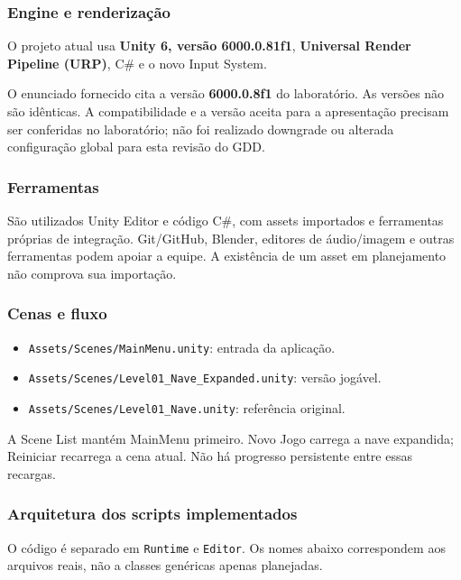 \documentclass[12pt,a4paper]{article}
\begin{document}
\subsubsection*{Engine e renderização}

O projeto atual usa \textbf{Unity 6, versão 6000.0.81f1},
\textbf{Universal Render Pipeline (URP)}, C\# e o novo Input System.

O enunciado fornecido cita a versão \textbf{6000.0.8f1} do laboratório.
As versões não são idênticas. A compatibilidade e a versão aceita
para a apresentação precisam ser conferidas no laboratório; não
foi realizado downgrade ou alterada configuração global para esta
revisão do GDD.

\subsubsection*{Ferramentas}

São utilizados Unity Editor e código C\#, com assets importados e
ferramentas próprias de integração. Git/GitHub, Blender, editores
de áudio/imagem e outras ferramentas podem apoiar a equipe.
A existência de um asset em planejamento não comprova sua importação.

\subsubsection*{Cenas e fluxo}

\begin{itemize}
\item \texttt{Assets/Scenes/MainMenu.unity}: entrada da aplicação.
\item \texttt{Assets/Scenes/Level01\_Nave\_Expanded.unity}: versão jogável.
\item \texttt{Assets/Scenes/Level01\_Nave.unity}: referência original.
\end{itemize}

A Scene List mantém MainMenu primeiro. Novo Jogo carrega a nave
expandida; Reiniciar recarrega a cena atual. Não há progresso
persistente entre essas recargas.

\subsubsection*{Arquitetura dos scripts implementados}

O código é separado em \texttt{Runtime} e \texttt{Editor}.
Os nomes abaixo correspondem aos arquivos reais, não a classes
genéricas apenas planejadas.
\end{document}
